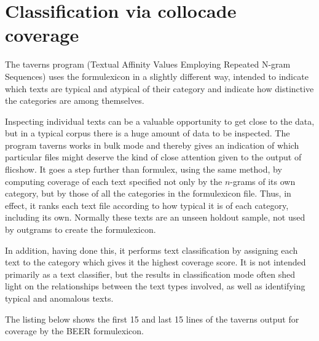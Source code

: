\documentclass[output=paper]{langscibook}
\begin{document}
\section{Classification via collocade coverage}

The taverns program (Textual Affinity Values Employing Repeated N-gram Sequences) uses the formulexicon in a slightly different way, intended to indicate which texts are typical and atypical of their category and indicate how distinctive the categories are among themselves.

Inspecting individual texts can be a valuable opportunity to get close to the data, but in a typical corpus there is a huge amount of data to be inspected. The program taverns works in bulk mode and thereby gives an indication of which particular files might deserve the kind of close attention given to the output of flicshow. It goes a step further than formulex, using the same method, by computing coverage of each text specified not only by the $n$-grams of its own category, but by those of all the categories in the formulexicon file. Thus, in effect, it ranks each text file according to how typical it is of each category, including its own. Normally these texts are an unseen holdout sample, not used by outgrams to create the formulexicon.

In addition, having done this, it performs text classification by assigning each text to the category which gives it the highest coverage score. It is not intended primarily as a text classifier, but the results in classification mode often shed light on the relationships between the text types involved, as well as identifying typical and anomalous texts.

The listing below shows the first 15 and last 15 lines of the taverns output for coverage by the BEER formulexicon.
\end{document}
